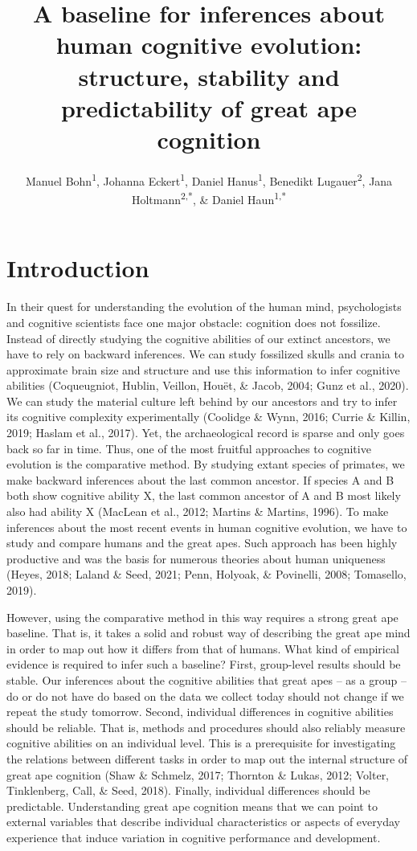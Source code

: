 \documentclass[
  man,floatsintext]{apa6}
\title{A baseline for inferences about human cognitive evolution: structure, stability and predictability of great ape cognition}
\author{Manuel Bohn\textsuperscript{1}, Johanna Eckert\textsuperscript{1}, Daniel Hanus\textsuperscript{1}, Benedikt Lugauer\textsuperscript{2}, Jana Holtmann\textsuperscript{2,*}, \& Daniel Haun\textsuperscript{1,*}}
\date{}
\affiliation{\vspace{0.5cm}\textsuperscript{1} Department of Comparative Cultural Psychology, Max Planck Institute for Evolutionary Anthropology, Leipzig, Germany\\\textsuperscript{2} Psychologische Hochschule Berlin, Berlin, Germany\\\textsuperscript{*} Shared senior authorship}
\begin{document}
\maketitle

\hypertarget{introduction}{%
\section{Introduction}\label{introduction}}

In their quest for understanding the evolution of the human mind, psychologists and cognitive scientists face one major obstacle: cognition does not fossilize. Instead of directly studying the cognitive abilities of our extinct ancestors, we have to rely on backward inferences. We can study fossilized skulls and crania to approximate brain size and structure and use this information to infer cognitive abilities (Coqueugniot, Hublin, Veillon, Houët, \& Jacob, 2004; Gunz et al., 2020). We can study the material culture left behind by our ancestors and try to infer its cognitive complexity experimentally (Coolidge \& Wynn, 2016; Currie \& Killin, 2019; Haslam et al., 2017). Yet, the archaeological record is sparse and only goes back so far in time. Thus, one of the most fruitful approaches to cognitive evolution is the comparative method. By studying extant species of primates, we make backward inferences about the last common ancestor. If species A and B both show cognitive ability X, the last common ancestor of A and B most likely also had ability X (MacLean et al., 2012; Martins \& Martins, 1996). To make inferences about the most recent events in human cognitive evolution, we have to study and compare humans and the great apes. Such approach has been highly productive and was the basis for numerous theories about human uniqueness (Heyes, 2018; Laland \& Seed, 2021; Penn, Holyoak, \& Povinelli, 2008; Tomasello, 2019).

However, using the comparative method in this way requires a strong great ape baseline. That is, it takes a solid and robust way of describing the great ape mind in order to map out how it differs from that of humans. What kind of empirical evidence is required to infer such a baseline? First, group-level results should be stable. Our inferences about the cognitive abilities that great apes -- as a group -- do or do not have do based on the data we collect today should not change if we repeat the study tomorrow. Second, individual differences in cognitive abilities should be reliable. That is, methods and procedures should also reliably measure cognitive abilities on an individual level. This is a prerequisite for investigating the relations between different tasks in order to map out the internal structure of great ape cognition (Shaw \& Schmelz, 2017; Thornton \& Lukas, 2012; Volter, Tinklenberg, Call, \& Seed, 2018). Finally, individual differences should be predictable. Understanding great ape cognition means that we can point to external variables that describe individual characteristics or aspects of everyday experience that induce variation in cognitive performance and development.
\end{document}
